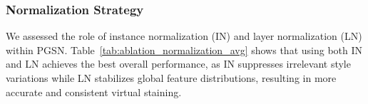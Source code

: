 \documentclass[journal,twoside,web]{ieeecolor}
\begin{document}

\subsubsection{Normalization Strategy}
 {We assessed the role of instance normalization (IN) and layer normalization (LN) within PGSN. Table~\ref{tab:ablation_normalization_avg} shows that using both IN and LN achieves the best overall performance, as IN suppresses irrelevant style variations while LN stabilizes global feature distributions, resulting in more accurate and consistent virtual staining.}


\begin{table}[!htbp]
  \centering
  \setlength\tabcolsep{2pt}
  \renewcommand{\arraystretch}{1.0}
  \caption{{ABLATION STUDY OF NORMALIZATION STRATEGY ON MIST DATASET. THE BEST SCORES ARE HIGHLIGHTED IN BOLD.}}
  \label{tab:ablation_normalization_avg}

\end{table}
\end{document}
